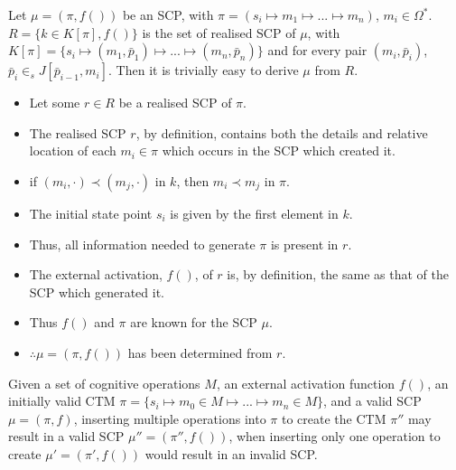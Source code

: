 \begin{lemma}\label{lemma:realisedToMonotonic}
Let $\mu=(\pi,f())$ be an SCP, with $\pi=(s_i \longmapsto m_1 \longmapsto ... \longmapsto m_n)$, $m_i\in \Omega^*$. $R=\{k \in K[\pi],f()\}$ is the set of realised SCP of $\mu$, with $K[\pi]=\{s_i \longmapsto (m_1,\bar{p}_1) \longmapsto ... \longmapsto (m_n,\bar{p}_n)\}$ and for every pair $(m_i,\bar{p}_i)$, $\bar{p}_i \in_s J[\bar{p}_{i-1},m_i]$. Then it is trivially easy to derive $\mu$ from $R$.

\end{lemma}
\begin{bulletProof} \label{proof:realisedToMonotonic}
\begin{itemize}
\item Let some $r \in R$ be a realised SCP of $\pi$.
\item The realised SCP $r$, by definition, contains both the details and relative location of each $m_i \in \pi$ which occurs in the SCP which created it.
\item if $(m_i,\cdot) \prec (m_j,\cdot)$ in $k$, then $m_i \prec m_j$ in $\pi$.
\item The initial state point $s_i$ is given by the first element in $k$.
\item Thus, all information needed to generate $\pi$ is present in $r$.
\item The external activation, $f()$, of $r$ is, by definition, the same as that of the SCP which generated it.
\item Thus $f()$ and $\pi$ are known for the SCP $\mu$.
\item $\therefore \mu=(\pi,f())$ has been determined from $r$.
\end{itemize}

\end{bulletProof}













\begin{lemma}\label{lemma:insertionSearch}
Given a set of cognitive operations $M$, an external activation function $f()$, an initially valid CTM $\pi=\{s_i \longmapsto m_0\in M \longmapsto ... \longmapsto m_n\in M\}$, and a valid SCP $\mu=(\pi,f)$, inserting multiple operations into $\pi$ to create the CTM $\pi''$ may result in a valid SCP $\mu''=(\pi'',f())$, when inserting only one operation to create $\mu'=(\pi',f())$ would result in an invalid SCP.
\end{lemma}

